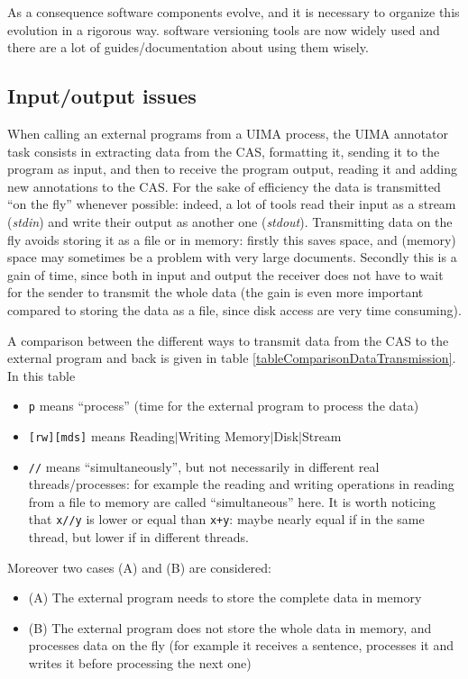\documentclass{article}
\newenvironment{xitemize}{
\begin{itemize}
  \setlength{\itemsep}{.3\baselineskip}
  \setlength{\topsep}{0pt}
  \setlength{\parskip}{0pt}
  \setlength{\parsep}{0pt}
}{\end{itemize}}
\begin{document}
As a consequence software components evolve, and it is necessary to organize this evolution in a rigorous way. software versioning tools are now widely used and there are a lot of guides/documentation about using them wisely.

\subsection{Input/output issues}

\label{partIOIssuesEfficiency}
When calling an external programs from a UIMA process, the UIMA annotator task consists in extracting data from the CAS, formatting it, sending it to the program as input, and then to receive the program output, reading it and adding new annotations to the CAS. For the sake of efficiency the data is transmitted ``on the fly'' whenever possible: indeed, a lot of tools read their input as a stream ({\em stdin}) and write their output as another one ({\em stdout}). Transmitting data on the fly avoids storing it as a file or in memory: firstly this saves space, and (memory) space may sometimes be a problem with very large documents. Secondly this is a gain of time, since both in input and output the receiver does not have to wait for the sender to transmit the whole data (the gain is even more important compared to storing the data as a file, since disk access are very time consuming).
\medskip


A comparison between the different ways to transmit data from the CAS to the external program and back is given in table \ref{tableComparisonDataTransmission}. In this table
\begin{xitemize}
\item {\tt p} means ``process'' (time for the external program to process the data)
\item {\tt [rw][mds]} means Reading$|$Writing Memory$|$Disk$|$Stream
\item  {\tt //} means ``simultaneously'', but not necessarily in different real threads/processes: for example the reading and writing operations in reading from a file to memory are called ``simultaneous'' here. It is worth noticing that {\tt x//y} is lower or equal than {\tt x+y}: maybe nearly equal if in the same thread, but lower if in different threads.
\end{xitemize}

Moreover two cases (A) and (B) are considered:
\begin{xitemize}
\item[(A)] The external program needs to store the complete data in memory
\item[(B)] The external program does not store the whole data in memory, and processes data on the fly (for example it receives a sentence, processes it and writes it before processing the next one)
\end{xitemize}
\end{document}
